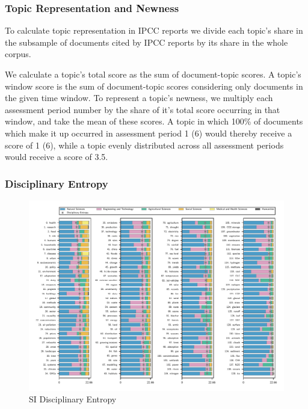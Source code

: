 \documentclass{article}
\begin{document}
\begin{linenumbers}
		
	\subsubsection*{Topic Representation and Newness}
	
	To calculate topic representation in IPCC reports we divide each topic's share in the subsample of documents cited by IPCC reports by its share in the whole corpus. 
	
	We calculate a topic's total score as the sum of document-topic scores. A topic's window score is the sum of document-topic scores considering only documents in the given time window. To represent a topic's newness, we multiply each assessment period number by the share of it's total score occurring in that window, and take the mean of these scores. A topic in which 100\% of documents which make it up occurred in assessment period 1 (6) would thereby receive a score of 1 (6), while a topic evenly distributed across all assessment periods would receive a score of 3.5.
	
	
	\subsubsection*{Disciplinary Entropy}

	\begin{figure}
		\begin{center}
			\includegraphics[width=1\linewidth]{plots_pub/topic_oecd_entropy.pdf}
			\caption{SI Disciplinary Entropy}
			\label{dis-entropy}
		\end{center}
	\end{figure}	
	

\end{linenumbers}
\end{document}
